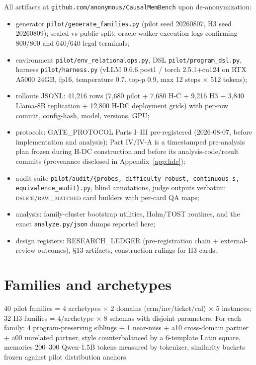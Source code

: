 All artifacts at \texttt{github.com/anonymous/CausalMemBench} upon de-anonymization:
\begin{itemize}[leftmargin=1.4em]
  \item generator \texttt{pilot/generate\_families.py} (pilot seed 20260807, H3 seed 20260809); sealed-vs-public split; oracle walker execution logs confirming 800/800 and 640/640 legal terminals;
  \item environment \texttt{pilot/env\_relationalops.py}, DSL \texttt{pilot/program\_dsl.py}, harness \texttt{pilot/harness.py} (vLLM 0.6.6.post1 / torch 2.5.1+cu124 on RTX A5000 24GB, fp16, temperature 0.7, top-p 0.9, max 12 steps $\times$ 512 tokens);
  \item rollouts JSONL: 41{,}216 rows (7{,}680 pilot + 7{,}680 H-C + 9{,}216 H3 + 3{,}840 Llama-8B replication + 12{,}800 H-DC deployment grids) with per-row commit, config-hash, model, versions, GPU;
  \item protocols: GATE\_PROTOCOL Parts I--III pre-registered (2026-08-07, before implementation and analysis); Part IV/IV-A is a timestamped pre-analysis plan frozen during H-DC construction and before its analysis-code/result commits (provenance disclosed in Appendix~\ref{app:hdc});
  \item audit suite \texttt{pilot/audit/\{probes, difficulty\_robust, continuous\_s, equivalence\_audit\}.py}, blind annotations, judge outputs verbatim; \textsc{dslice}/\textsc{raw\_matched} card builders with per-card QA maps;
  \item analysis: family-cluster bootstrap utilities, Holm/TOST routines, and the exact \texttt{analyze.py/json} dumps reported here;
  \item design registers: RESEARCH\_LEDGER (pre-registration chain + external-review outcomes), §13 artifacts, construction rulings for H3 cards.
\end{itemize}

\section{Families and archetypes}
\label{app:families}

40 pilot families = 4 archetypes $\times$ 2 domains (crm/inv/ticket/cal) $\times$ 5 instances; 32 H3 families = 4/archetype $\times$ 8 schemas with disjoint parameters. For each family: 4 program-preserving siblings + 1 near-miss + a10 cross-domain partner + a00 unrelated partner, style counterbalanced by a 6-template Latin square, memories 200--300 Qwen-1.5B tokens measured by tokenizer, similarity buckets frozen against pilot distribution anchors.

